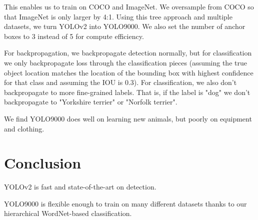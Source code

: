 \documentclass[a4paper]{article}
\begin{document}
This enables us to train on COCO and ImageNet. We oversample from COCO so that
ImageNet is only larger by 4:1. Using this tree approach and multiple datasets,
we turn YOLOv2 into YOLO9000. We also set the number of anchor boxes to 3
instead of 5 for compute efficiency.

For backpropagation, we backpropagate detection normally, but for classification
we only backpropagate loss through the classification pieces (assuming the true
object location matches the location of the bounding box with highest confidence
for that class and assuming the IOU is 0.3). For classification, we also don't
backpropagate to more fine-grained labels. That is, if the label is "dog" we
don't backpropagate to "Yorkshire terrier" or "Norfolk terrier".

We find YOLO9000 does well on learning new animals, but poorly on equipment and
clothing.

\section{Conclusion}
YOLOv2 is fast and state-of-the-art on detection.

YOLO9000 is flexible enough to train on many different datasets thanks to our
hierarchical WordNet-based classification.
\end{document}
